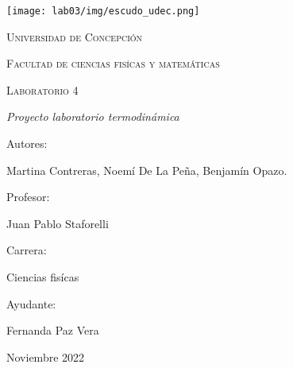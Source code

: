 \documentclass[]{article}
\begin{document}
\begin{titlepage}
      \begin{center}     
              
            \texttt{[image: lab03/img/escudo\_udec.png]}                       %
            
            
            
            \vspace{1cm}
            \textsc{{\LARGE Universidad de Concepción}}
            
            \vspace{1cm}
            {\scshape\Large Facultad de ciencias fisícas y matemáticas \par}
            \vspace{2cm}
            {\scshape\Huge Laboratorio 4 \par}
            \vspace{2cm}
            {\itshape\Large Proyecto laboratorio termodinámica \par}
            \vfill
            {\Large Autores: \par}
            {\Large Martina Contreras, Noemí De La Peña, Benjamín Opazo. \par}
            \vfill
            \vfill
            {\Large Profesor: \par}
            {\Large Juan Pablo Staforelli \par}
            \vfill
            \vfill
            {\Large Carrera: \par}
            {\Large Ciencias fisícas \par}
            \vfill
            \vfill
            {\Large Ayudante: \par}
            {\Large Fernanda Paz Vera \par}
            \vfill
            {\Large Noviembre 2022 \par}
      \end{center}
\end{titlepage}            
 

\tableofcontents
\newpage







\end{document}
